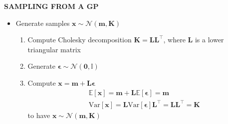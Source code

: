 \begin{whitebox}{\textbf{SAMPLING FROM A GP}}
    \begin{itemize}
        \item Generate samples $\bm{x}\sim\mathcal{N}(\bm{m},\bm{K})$
        \begin{enumerate}
            \item Compute Cholesky decomposition $\bm{K}=\bm{LL}^\top$, where $\bm{L}$ is a lower triangular matrix
            \item Generate $\bm{\epsilon}\sim\mathcal{N}(\bm{0},\mathbb{I})$
            \item Compute $\bm{x}=\bm{m}+\bm{L}\bm{\epsilon}$
            \begin{align*}
                &\mathbb{E}[\bm{x}]=\bm{m}+\bm{L}\mathbb{E}[\bm{\epsilon}]=\bm{m}\\
                &\mathrm{Var}[\bm{x}]=\bm{L}\mathrm{Var}[\bm{\epsilon}]\bm{L}^\top=\bm{LL}^\top=\bm{K}
            \end{align*}
            to have $\bm{x}\sim\mathcal{N}(\bm{m},\bm{K})$
        \end{enumerate}
    \end{itemize}
\end{whitebox}